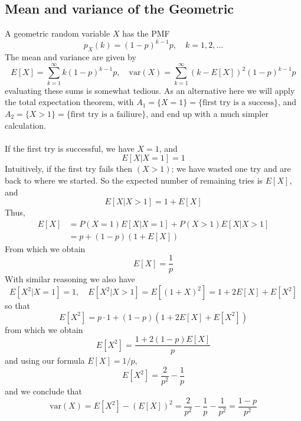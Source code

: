 \documentclass{report}
\begin{document}
\subsection{Mean and variance of the Geometric}
A geometric random variable $X$ has the PMF
\begin{equation*}
p_X(k)=(1-p)^{k-1}p,\quad k=1,2,\ldots
\end{equation*}
The mean and variance are given by
\begin{equation*}
E[X]=\sum^{\infty}_{k=1}k(1-p)^{k-1}p,\quad\text{var}(X)=\sum^{\infty}_{k=1}(k-E[X])^2(1-p)^{k-1}p
\end{equation*}
evaluating these sums is somewhat tedious. As an alternative here we will apply the total expectation theorem, with $A_1=\{X=1\}=\{\text{first try is a success}\}$, and $A_2=\{X>1\}=\{\text{first try is a failiure}\}$, and end up with a much simpler calculation.\\
\vspace{1mm}\\
If the first try is successful, we have $X=1$, and
\begin{equation*}
E[X|X=1]=1
\end{equation*}
Intuitively, if the first try fails then $(X>1)$; we have wasted one try and are back to where we started. So the expected number of remaining tries is $E[X]$, and
\begin{equation*}
E[X|X>1]=1+E[X]
\end{equation*}
Thus,
\begin{align*}
E[X]&=P(X=1)E[X|X=1]+P(X>1)E[X|X>1]\\
&=p+(1-p)(1+E[X])
\end{align*}
From which we obtain
\begin{equation*}
E[X]=\frac{1}{p}
\end{equation*}
With similar reasoning we also have 
\begin{equation*}
E[X^2|X=1]=1,\quad E[X^2|X>1]=E[(1+X)^2]=1+2E[X]+E[X^2]
\end{equation*}
so that
\begin{equation*}
E[X^2]=p\cdot 1+(1-p)(1+2E[X]+E[X^2])
\end{equation*}
from which we obtain
\begin{equation*}
E[X^2]=\frac{1+2(1-p)E[X]}{p}
\end{equation*}
and using our formula $E[X]=1/p$,
\begin{equation*}
E[X^2]=\frac{2}{p^2}-\frac{1}{p}
\end{equation*}
and we conclude that
\begin{equation*}
\text{var}(X)=E[X^2]-(E[X])^2=\frac{2}{p^2}-\frac{1}{p}-\frac{1}{p^2}=\frac{1-p}{p^2}
\end{equation*}
\newpage
\end{document}
